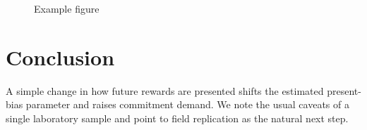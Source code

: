 \documentclass[
    fontsize=12pt,fleqn,
    letterpaper,oneside,paper=portrait,
]{scrartcl}
\begin{document}
\begin{figure}\centering
  \caption{Example figure\label{fig:example}}
\end{figure}

%
%
%

\section{Conclusion}\label{sec:conclusion}

A simple change in how future rewards are presented shifts the estimated
present-bias parameter and raises commitment demand. We note the usual caveats
of a single laboratory sample and point to field replication as the natural
next step.

\vspace{1\baselineskip}

{\RaggedRight \printbibliography}


%


\clearpage
{} %
\normalfont %
\linespread{1}\selectfont %
\end{document}
